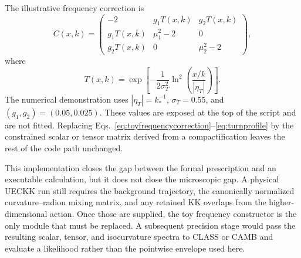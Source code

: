 \documentclass[aps,prd,twocolumn,superscriptaddress,nofootinbib,longbibliography,floatfix]{revtex4-2}
\begin{document}
The illustrative frequency correction is
\begin{equation}
C(x,k)=
\begin{pmatrix}
-2 & g_1T(x,k) & g_2T(x,k)\\
g_1T(x,k) & \mu_1^2-2 & 0\\
g_2T(x,k) & 0 & \mu_2^2-2
\end{pmatrix},
\label{eq:toyfrequencycorrection}
\end{equation}
where
\begin{equation}
T(x,k)=\exp\left[-\frac{1}{2\sigma_T^2}
\ln^2\left(\frac{x/k}{|\eta_T|}\right)\right].
\label{eq:turnprofile}
\end{equation}
The numerical demonstration uses $|\eta_T|=k_*^{-1}$, $\sigma_T=0.55$, and $(g_1,g_2)=(0.05,0.025)$.  These values are exposed at the top of the script and are not fitted.  Replacing Eqs.~\eqref{eq:toyfrequencycorrection}--\eqref{eq:turnprofile} by the constrained scalar or tensor matrix derived from a compactification leaves the rest of the code path unchanged.

This implementation closes the gap between the formal prescription and an executable calculation, but it does not close the microscopic gap.  A physical UECKK run still requires the background trajectory, the canonically normalized curvature--radion mixing matrix, and any retained KK overlaps from the higher-dimensional action.  Once those are supplied, the toy frequency constructor is the only module that must be replaced.  A subsequent precision stage would pass the resulting scalar, tensor, and isocurvature spectra to CLASS or CAMB and evaluate a likelihood rather than the pointwise envelope used here.

\nocite{REVTEX42Control}


\end{document}
